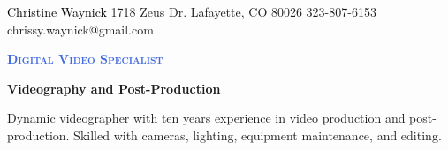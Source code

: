 \documentclass[letterpaper, 11pt]{article}
\newcommand{\CawColorName}{Black}
\newcommand{\CawColorTitle}{RoyalBlue}
\begin{document}
%
\cawtitle
{\textcolor{\CawColorName}{Christine Waynick}}
{1718 Zeus Dr.}
{Lafayette, CO 80026}
{323-807-6153}
{chrissy.waynick@gmail.com}
%
\begin{center}\par\smallskip
\textcolor{\CawColorTitle}{\Large \textbf{\textsc{Digital Video Specialist}}}\par
\large \textbf{{Videography and Post-Production}}\par
\smallskip
\noindent \begin{minipage}[t]{0.75\textwidth}%
\begin{sloppypar}
Dynamic videographer with ten years experience in video production and
post-production. Skilled with cameras, lighting, equipment maintenance, and editing.
\end{sloppypar}
\end{minipage}
\end{center}
\par \smallskip \smallskip

\end{document}
